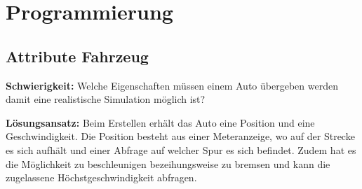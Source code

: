 \chapter{Programmierung}
\section{Attribute Fahrzeug}
\textbf{Schwierigkeit:} Welche Eigenschaften müssen einem Auto übergeben werden damit eine realistische Simulation möglich ist?
\begin{addmargin}[25pt]{0pt}
	\item \textbf{Lösungsansatz:} Beim Erstellen erhält das Auto eine Position und eine Geschwindigkeit. Die Position besteht aus einer Meteranzeige, wo auf der Strecke es sich aufhält und einer Abfrage auf welcher Spur es sich befindet. Zudem hat es die Möglichkeit zu beschleunigen bezeihungsweise zu bremsen und kann die zugelassene Höchstgeschwindigkeit abfragen. \\
\end{addmargin}

